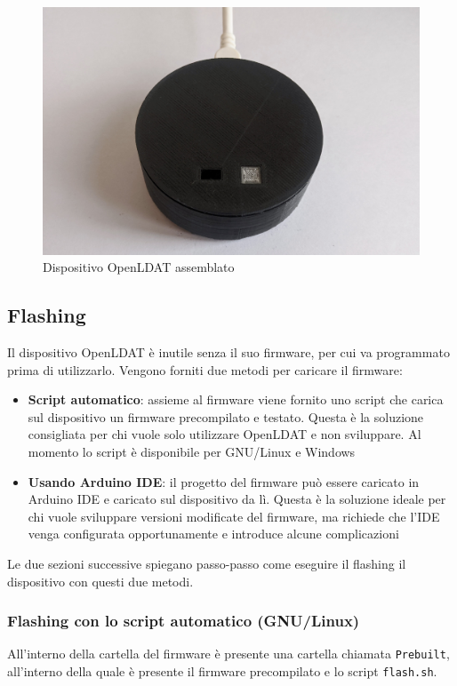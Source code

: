 \begin{figure}[H]
	\centering
	\includegraphics[width=\textwidth]{Dispositivo_files/assembly_15.jpg}
	\caption{Dispositivo OpenLDAT assemblato}
	\label{fig:assembly_15}
\end{figure}

\subsection{Flashing}
Il dispositivo OpenLDAT è inutile senza il suo firmware, per cui va programmato prima di utilizzarlo. Vengono forniti due metodi per caricare il firmware:
\begin{itemize}
	\item \textbf{Script automatico}: assieme al firmware viene fornito uno script che carica sul dispositivo un firmware precompilato e testato. Questa è la soluzione consigliata per chi vuole solo utilizzare OpenLDAT e non sviluppare. Al momento lo script è disponibile per GNU/Linux e Windows
	\item \textbf{Usando Arduino IDE}: il progetto del firmware può essere caricato in Arduino IDE e caricato sul dispositivo da lì. Questa è la soluzione ideale per chi vuole sviluppare versioni modificate del firmware, ma richiede che l'IDE venga configurata opportunamente e introduce alcune complicazioni
\end{itemize}

Le due sezioni successive spiegano passo-passo come eseguire il flashing il dispositivo con questi due metodi.

\subsubsection{Flashing con lo script automatico (GNU/Linux)}
All'interno della cartella del firmware è presente una cartella chiamata \texttt{Prebuilt}, all'interno della quale è presente il firmware precompilato e lo script \texttt{flash.sh}.

